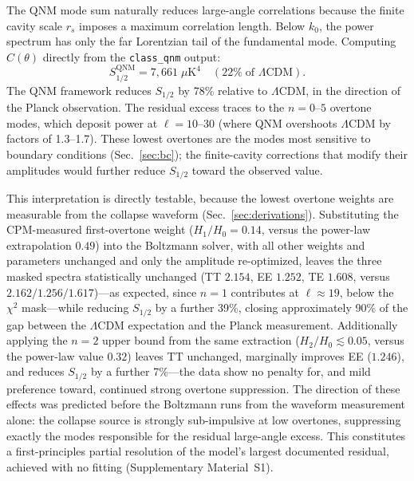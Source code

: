 \documentclass[aps,prd,twocolumn,superscriptaddress,showpacs,preprintnumbers,amsmath,amssymb,nofootinbib]{revtex4-2}
\newcommand{\lcdm}{$\Lambda$CDM}
\begin{document}
The QNM mode sum naturally reduces large-angle correlations because the finite cavity scale $r_s$ imposes a maximum correlation length. Below $k_0$, the power spectrum has only the far Lorentzian tail of the fundamental mode. Computing $C(\theta)$ directly from the \texttt{class\_qnm} output:
\begin{equation}
S_{1/2}^\mathrm{QNM} = 7{,}661\;\mu\mathrm{K}^4 \quad (22\%\;\text{of \lcdm}).
\end{equation}
The QNM framework reduces $S_{1/2}$ by 78\% relative to \lcdm, in the direction of the Planck observation. The residual excess traces to the $n = 0$--$5$ overtone modes, which deposit power at $\ell = 10$--$30$ (where QNM overshoots \lcdm{} by factors of 1.3--1.7). These lowest overtones are the modes most sensitive to boundary conditions (Sec.~\ref{sec:bc}); the finite-cavity corrections that modify their amplitudes would further reduce $S_{1/2}$ toward the observed value.

This interpretation is directly testable, because the lowest overtone weights are measurable from the collapse waveform (Sec.~\ref{sec:derivations}). Substituting the CPM-measured first-overtone weight ($H_1/H_0 = 0.14$, versus the power-law extrapolation $0.49$) into the Boltzmann solver, with all other weights and parameters unchanged and only the amplitude re-optimized, leaves the three masked spectra statistically unchanged (TT $2.154$, EE $1.252$, TE $1.608$, versus $2.162/1.256/1.617$)---as expected, since $n = 1$ contributes at $\ell \approx 19$, below the $\chi^2$ mask---while reducing $S_{1/2}$ by a further 39\%, closing approximately 90\% of the gap between the \lcdm{} expectation and the Planck measurement. Additionally applying the $n = 2$ upper bound from the same extraction ($H_2/H_0 \lesssim 0.05$, versus the power-law value $0.32$) leaves TT unchanged, marginally improves EE ($1.246$), and reduces $S_{1/2}$ by a further 7\%---the data show no penalty for, and mild preference toward, continued strong overtone suppression. The direction of these effects was predicted before the Boltzmann runs from the waveform measurement alone: the collapse source is strongly sub-impulsive at low overtones, suppressing exactly the modes responsible for the residual large-angle excess. This constitutes a first-principles partial resolution of the model's largest documented residual, achieved with no fitting (Supplementary Material~S1).
\end{document}
